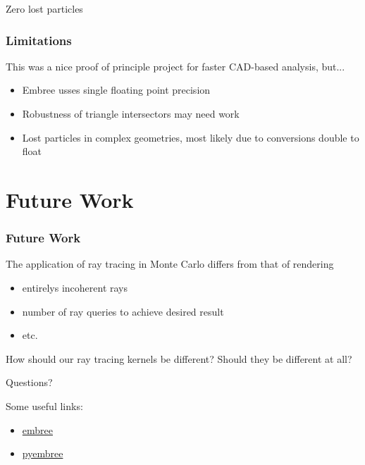 \documentclass[12pt]{beamer}
\begin{document}
\begin{frame}
\begin{table}
\begin{center}
\begin{tabular}{lccc}
    \end{tabular}
  \end{center}
\end{table}

    Zero lost particles


\end{frame}

\begin{frame}
\frametitle{Limitations}

This was a nice proof of principle project for faster CAD-based analysis, but... \\
\vfill
\begin{itemize}
\item Embree usses single floating point precision 
\item Robustness of triangle intersectors may need work
\item Lost particles in complex geometries, most likely due to conversions double to float
\end{itemize}
\end{frame}

\section{Future Work} %

\begin{frame}

\frametitle{Future Work}

\vfill
The application of ray tracing in Monte Carlo differs from that of rendering
  \begin{itemize}
    \item entirelys incoherent rays
    \item number of ray queries to achieve desired result
    \item etc.
  \end{itemize}
\vfill
How should our ray tracing kernels be different? Should they be different at all?

\end{frame}

\begin{frame}

\begin{center}
\vfill
\huge {Questions?}
\vfill
\end{center}
\normalsize
Some useful links:
\begin{itemize}
\item \href{https://embree.github.io/}{{\color{blue}embree}}
\item \href{https://github.com/scopatz/pyembree}{{\color{blue}pyembree}}
\end{itemize}

\end{frame}
\end{document}
